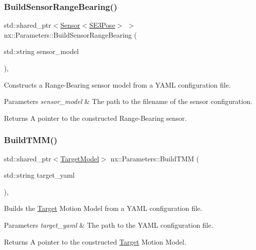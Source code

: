 \subsubsection{\texorpdfstring{Build\+Sensor\+Range\+Bearing()}{BuildSensorRangeBearing()}}
{\footnotesize\ttfamily std\+::shared\+\_\+ptr$<$\hyperlink{classnx_1_1Sensor}{Sensor}$<$\hyperlink{structnx_1_1SE3Pose}{S\+E3\+Pose}$>$ $>$ nx\+::\+Parameters\+::\+Build\+Sensor\+Range\+Bearing (\begin{DoxyParamCaption}\item[{std\+::string}]{sensor\+\_\+model }\end{DoxyParamCaption})\hspace{0.3cm}{\ttfamily [inline]}, {\ttfamily [protected]}}

Constructs a Range-\/\+Bearing sensor model from a Y\+A\+ML configuration file. 
\begin{DoxyParams}{Parameters}
{\em sensor\+\_\+model} & The path to the filename of the sensor configuration. \\
\hline
\end{DoxyParams}
\begin{DoxyReturn}{Returns}
A pointer to the constructed Range-\/\+Bearing sensor. 
\end{DoxyReturn}
\mbox{\label{classnx_1_1Parameters_acfbdaae76e98bc8379db6356d5f2078c}} 
\subsubsection{\texorpdfstring{Build\+T\+M\+M()}{BuildTMM()}}
{\footnotesize\ttfamily std\+::shared\+\_\+ptr$<$\hyperlink{classnx_1_1TargetModel}{Target\+Model}$>$ nx\+::\+Parameters\+::\+Build\+T\+MM (\begin{DoxyParamCaption}\item[{std\+::string}]{target\+\_\+yaml }\end{DoxyParamCaption})\hspace{0.3cm}{\ttfamily [inline]}, {\ttfamily [protected]}}

Builds the \hyperlink{structnx_1_1Target}{Target} Motion Model from a Y\+A\+ML configuration file. 
\begin{DoxyParams}{Parameters}
{\em target\+\_\+yaml} & The path to the Y\+A\+ML configuration file. \\
\hline
\end{DoxyParams}
\begin{DoxyReturn}{Returns}
A pointer to the constructed \hyperlink{structnx_1_1Target}{Target} Motion Model. 
\end{DoxyReturn}
\mbox{\label{classnx_1_1Parameters_aabae7ec0743096b9980264f6613e961e}} 
